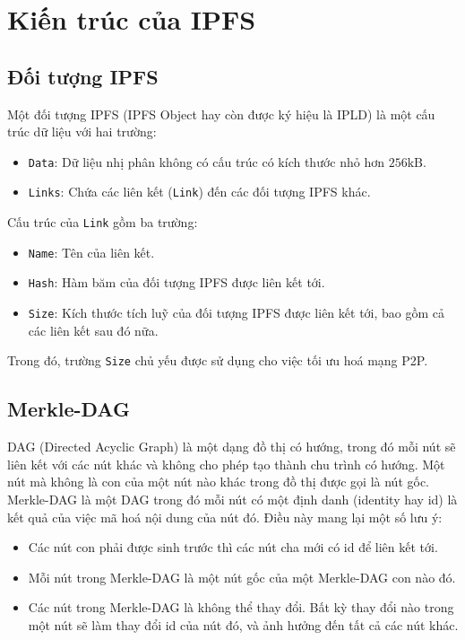 \section{Kiến trúc của IPFS}

\subsection{Đối tượng IPFS}

Một đối tượng IPFS (IPFS Object hay còn được ký hiệu là IPLD) là một cấu trúc dữ liệu với hai trường:
\begin{itemize}
    \item \texttt{Data}: Dữ liệu nhị phân không có cấu trúc có kích thước nhỏ hơn $256\mathrm{kB}$.
    \item \texttt{Links}: Chứa các liên kết (\texttt{Link}) đến các đối tượng IPFS khác.
\end{itemize}

Cấu trúc của \texttt{Link} gồm ba trường:
\begin{itemize}
    \item \texttt{Name}: Tên của liên kết.
    \item \texttt{Hash}: Hàm băm của đối tượng IPFS được liên kết tới.
    \item \texttt{Size}: Kích thước tích luỹ của đối tượng IPFS được liên kết tới, bao gồm cả các liên kết sau đó nữa.
\end{itemize}
Trong đó, trường \texttt{Size} chủ yếu được sử dụng cho việc tối ưu hoá mạng P2P.

\subsection{Merkle-DAG}

DAG (Directed Acyclic Graph) là một dạng đồ thị có hướng, trong đó mỗi nút sẽ liên kết với các nút khác và không cho phép tạo thành chu trình có hướng. Một nút mà không là con của một nút nào khác trong đồ thị được gọi là nút gốc.\\

Merkle-DAG là một DAG trong đó mỗi nút có một định danh (identity hay id) là kết quả của việc mã hoá nội dung của nút đó. Điều này mang lại một số lưu ý:
\begin{itemize}
    \item Các nút con phải được sinh trước thì các nút cha mới có id để liên kết tới.
    \item Mỗi nút trong Merkle-DAG là một nút gốc của một Merkle-DAG con nào đó.
    \item Các nút trong Merkle-DAG là không thể thay đổi. Bất kỳ thay đổi nào trong một nút sẽ làm thay đổi id của nút đó, và ảnh hưởng đến tất cả các nút khác.
\end{itemize}

